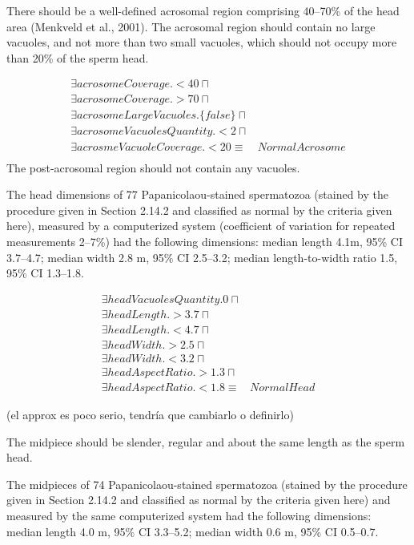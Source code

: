 \documentclass{article}
\begin{document}
There should be a well-defined acrosomal region comprising 40–70\% of the 
head area (Menkveld et al., 2001). The acrosomal region should contain no
large vacuoles, and not more than two small vacuoles, which should not occupy
more than 20\% of the sperm head.

\begin{align*}
\exists acrosomeCoverage.< 40 \sqcap &\\
\exists acrosomeCoverage.> 70 \sqcap &\\
\exists acrosomeLargeVacuoles.\{false\} \sqcap &\\
\exists acrosomeVacuolesQuantity.< 2 \sqcap &\\
\exists acrosmeVacuoleCoverage.<20 \equiv & NormalAcrosome\\
\end{align*}
The post-acrosomal region should not
contain any vacuoles. 

The head dimensions of 77 Papanicolaou-stained spermatozoa
(stained by the procedure given in Section 2.14.2 and classified as normal by the
criteria given here), measured by a computerized system (coefficient of variation
for repeated measurements 2–7\%) had the following dimensions: median length
4.1m, 95\% CI 3.7–4.7; median width 2.8 m, 95\% CI 2.5–3.2; median length-to-width
ratio 1.5, 95\% CI 1.3–1.8.

\begin{align*}
\exists headVacuolesQuantity.0 \sqcap &\\
\exists headLength.>3.7 \sqcap &\\
\exists headLength.<4.7 \sqcap &\\
\exists headWidth.>2.5 \sqcap &\\
\exists headWidth.<3.2 \sqcap &\\
\exists headAspectRatio.>1.3 \sqcap &\\
\exists headAspectRatio.<1.8 \equiv & NormalHead
\end{align*}

(el approx es poco serio, tendría que cambiarlo o definirlo)

The midpiece should be slender, regular and about the same length as the
sperm head.

The midpieces of 74 Papanicolaou-stained spermatozoa (stained
by the procedure given in Section 2.14.2 and classified as normal by the criteria
given here) and measured by the same computerized system had the following
dimensions: median length 4.0 m, 95\% CI 3.3–5.2; median width 0.6 m, 95\% CI
0.5–0.7.
\end{document}

